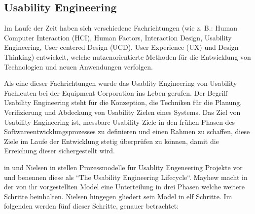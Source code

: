 \subsection{Usability Engineering}\label{UsaEng}

Im Laufe der Zeit haben sich verschiedene Fachrichtungen (wie z. B.: Human Computer Interaction (HCI), Human Factors, Interaction Design, Usability Engineering, 
User centered Design (UCD), User Experience (UX) und Design Thinking) entwickelt, welche nutzenorientierte Methoden für die Entwicklung von Technologien und neuen Anwendungen verfolgen. \cite[S.~7]{MichaelRichter2016}

Als eine dieser Fachrichtungen wurde das Usablity Engineering von Usability Fachleuten bei der Equipment Corporation ins Leben gerufen.  
Der Begriff Usability Engineering steht für die Konzeption, die Techniken für die Planung, Verifizierung und Abdeckung von Usability Zielen eines Systems. Das Ziel von Usability Engineering ist, 
messbare Usability-Ziele in den frühen Phasen des Softwareentwicklungsprozesses zu definieren und einen Rahmen zu schaffen, diese Ziele im Laufe der Entwicklung stetig überprüfen zu können, damit die Erreichung dieser sichergestellt wird. \cite[S.~14]{MaryBethRossonJohnM.CarrollDianeD.Cerra2002}

\citeauthor{Mayhew1999} in \cite{Mayhew1999} und Nielsen \citeauthor{Nielsen1994} in \cite{Nielsen1994} stellen Prozessmodelle für Usablity Engeneering Projekte vor und benennen diese als ``The Usability Engineering Lifecycle``. Mayhew macht in der von ihr vorgestellten Model eine Unterteilung in drei Phasen welche weitere Schritte beinhalten. Nielsen hingegen gliedert sein Model in elf Schritte. Im folgenden werden fünf 
dieser Schritte, genauer betrachtet: 

